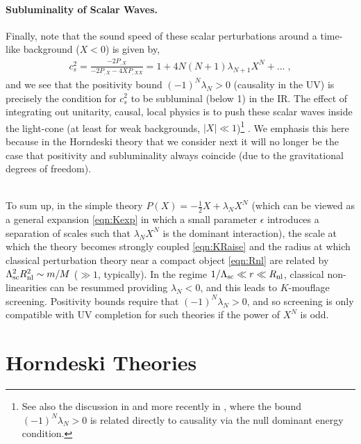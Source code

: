 \documentclass[11pt]{article}
\begin{document}
\paragraph{Subluminality of Scalar Waves.}
Finally, note that the sound speed of these scalar perturbations around a time-like background ($X < 0$) is given by,
\begin{align}
c_s^2  = \frac{ - 2 P_{,X} }{ -2 P_{,X} - 4 X P_{,XX}  } = 1 + 4 N (N+1) \lambda_{N+1} X^N + ... \; , 
\end{align}
and we see that the positivity bound $ (-1)^N \lambda_N > 0$ (causality in the UV) is precisely the condition for $c_s^2$ to be subluminal (below 1) in the IR. The effect of integrating out unitarity, causal, local physics is to push these scalar waves inside the light-cone (at least for weak backgrounds, $|X| \ll 1$)\footnote{
See also the discussion in \cite{Adams:2006sv} and more recently in \cite{Chandrasekaran:2018qmx}, where the bound $(-1)^N \lambda_N > 0$ is related directly to causality via the null dominant energy condition. 
} .
We emphasis this here because in the Horndeski theory that we consider next it will no longer be the case that positivity and subluminality always coincide (due to the gravitational degrees of freedom).


~\\
To sum up, in the simple theory $P(X)  = - \frac{1}{2} X +  \lambda_N X^N$ (which can be viewed as a general expansion \eqref{eqn:Kexp} in which a small parameter $\epsilon$ introduces a separation of scales such that $\lambda_N X^N$ is the dominant interaction), the scale at which the theory becomes strongly coupled \eqref{eqn:KRaise} and the radius at which classical perturbation theory near a compact object \eqref{eqn:Rnl} are related by $\Lambda_{\rm sc}^2 R_{\rm nl}^2 \sim  m/M$ ($\gg 1$, typically). In the regime $1/\Lambda_{\rm sc} \ll r \ll R_{\rm nl}$, classical non-linearities can be resummed providing $\lambda_N < 0$, and this leads to $K$-mouflage screening. Positivity bounds require that $(-1)^N \lambda_N > 0$, and so screening is only compatible with UV completion for such theories if the power of $X^N$ is odd. 
%


\section{Horndeski Theories}
\label{sec:horndeski}
\end{document}
